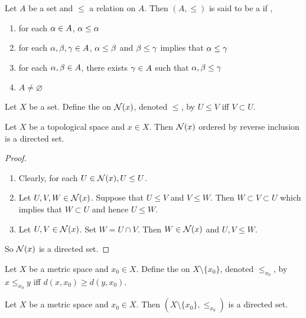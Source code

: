 \documentclass{book}
\begin{document}
	\begin{defn} 
	Let $A$ be a set and $\leq$ a relation on $A$. Then $(A, \leq)$ is said to be a  if , 
	\begin{enumerate}
	\item for each $\alpha \in A$, $\alpha \leq \alpha$
	\item for each $\alpha, \beta, \gamma \in A$, $\alpha \leq \beta$ and $\beta \leq \gamma$ implies that $\alpha \leq \gamma$
	\item for each $\alpha, \beta \in A$, there exists $\gamma \in A$ such that $\alpha, \beta \leq \gamma$
	\item $A \neq \varnothing$
	\end{enumerate}
	\end{defn}
	
	\begin{defn} 
	Let $X$ be a set. Define the  on $\mathcal{N}(x)$, denoted $\leq$, by $U \leq V$ iff $V \subset U$. 
	\end{defn}
	
	\begin{ex} 
	Let $X$ be a topological space and $x \in X$. Then $\mathcal{N}(x)$ ordered by reverse inclusion is a directed set.
	\end{ex}
	
	\begin{proof}\
	\begin{enumerate}
	\item Clearly, for each $U \in \mathcal{N}(x), U \leq U$.
	\item Let $U,V,W \in \mathcal{N}(x)$. Suppose that $U \leq V$ and $V \leq W$. Then $W \subset V \subset U$ which implies that $W \subset U$ and hence $U \leq W$.
	\item Let $U,V \in \mathcal{N}(x)$. Set $W = U \cap V$. Then $W \in \mathcal{N}(x)$ and $U,V \leq W$. 
	\end{enumerate}
	So $\mathcal{N}(x)$ is a directed set. 
	\end{proof}

	\begin{defn}
		Let $X$ be a metric space and $x_0 \in X$. Define the  on $X \setminus \{x_0\}$, denoted $\leq_{x_0}$, by $x \leq_{x_0} y$ iff $d(x, x_0) \geq d(y, x_0)$.
	\end{defn}

	\begin{ex}
		 Let $X$ be a metric space and $x_0 \in X$. Then $(X \setminus \{x_0\}, \leq_{x_0})$ is a directed set. 
	\end{ex}
\end{document}
